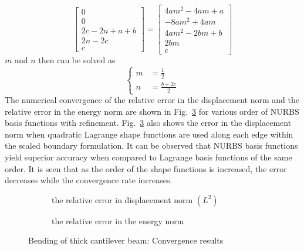     \begin{equation}
        \begin{bmatrix}
            0 \\
            0 \\
            2c - 2n +a +b \\
            2n - 2c \\
            c
        \end{bmatrix} = 
        \begin{bmatrix}
            4am^2-4am+a \\
            -8am^2 + 4am \\
            4am^2 -2bm +b \\
            2bm \\
            c
        \end{bmatrix}
    \end{equation}
%
$m$ and $n$ then can be solved as
    \begin{equation}
        \left\{
        \begin{aligned}
            m &= \frac{1}{2} \\
            n &= \frac{b+2c}{2}
        \end{aligned}
        \right.
    \end{equation}
%
The numerical convergence of the relative error in the displacement norm and the relative error in the energy norm are shown in Fig.~\ref{iso_fig:cantilever_beam_convergence} for various order of NURBS basis functions with refinement.
Fig.~\ref{iso_fig:cantilever_beam_convergence} also shows the error in the displacement norm when quadratic Lagrange shape functions are used along each edge within the scaled boundary formulation.
It can be observed that NURBS basis functions yield superior accuracy when compared to Lagrange basis functions of the same order.
It is seen that as the order of the shape functions is increased, the error decreases while the convergence rate increases.
\begin{figure}
    \begin{subfigure}[b]{1\linewidth}
        \centering
        \scalebox{0.7}{
            
        }
        \label{iso_fig:cantilever_beam_displacement_convergence}
        \caption{the relative error in displacement norm $(L^2)$}
    \end{subfigure}
    
    \begin{subfigure}[b]{1\linewidth}
        \centering
        \scalebox{0.7}{
            
        }
        \label{iso_fig:cantilever_beam_energy_convergence}
        \caption{the relative error in the energy norm}
    \end{subfigure}
\caption{Bending of thick cantilever beam: Convergence results}
\label{iso_fig:cantilever_beam_convergence}
\end{figure}
%
